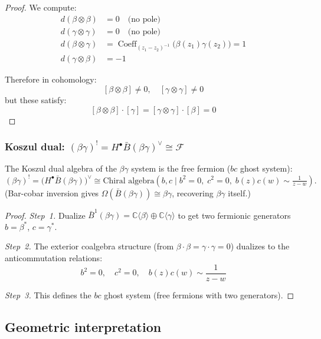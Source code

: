 \begin{proof}
We compute:
\begin{align}
d(\beta \otimes \beta) &= 0 \quad \text{(no pole)} \\
d(\gamma \otimes \gamma) &= 0 \quad \text{(no pole)} \\
d(\beta \otimes \gamma)
&=
\operatorname{Coeff}_{(z_1-z_2)^{-1}}
\bigl(\beta(z_1)\gamma(z_2)\bigr)=1 \\
d(\gamma \otimes \beta) &= -1
\end{align}

Therefore in cohomology:
\[[\beta \otimes \beta] \neq 0, \quad [\gamma \otimes \gamma] \neq 0\]
but these satisfy:
\[[\beta \otimes \beta] \cdot [\gamma] = [\gamma \otimes \gamma] \cdot [\beta] = 0\]
\end{proof}

\subsubsection{\texorpdfstring{Koszul dual: $(\beta\gamma)^! = H^\bullet\bar{B}(\beta\gamma)^\vee \cong \mathcal{F}$}{Koszul dual: (bg)! = F}}

\begin{theorem}
\label{thm:cobar-fermions}
The Koszul dual algebra of the $\beta\gamma$ system is the free fermion ($bc$ ghost system):
\[(\beta\gamma)^! =
\bigl(H^\bullet\bar{B}(\beta\gamma)\bigr)^\vee
\cong \text{Chiral algebra}(b, c \mid b^2 = 0,\; c^2 = 0,\; b(z)c(w) \sim \tfrac{1}{z-w}).\]
(Bar-cobar inversion gives $\Omega(\bar{B}(\beta\gamma)) \cong \beta\gamma$, recovering $\beta\gamma$ itself.)
\end{theorem}

\begin{proof}
\emph{Step~1.} Dualize $\bar{B}^1(\beta\gamma) = \mathbb{C}\langle \beta \rangle \oplus \mathbb{C}\langle \gamma \rangle$
to get two fermionic generators $b = \beta^*$, $c = \gamma^*$.

\emph{Step~2.} The exterior coalgebra structure (from $\beta \cdot \beta = \gamma \cdot \gamma = 0$) dualizes to the anticommutation relations:
\[b^2 = 0, \quad c^2 = 0, \quad b(z)c(w) \sim \frac{1}{z-w}\]

\emph{Step~3.} This defines the $bc$ ghost system (free fermions with two generators).
\end{proof}

\subsection{Geometric interpretation}
\label{subsec:NAP-betagamma}

